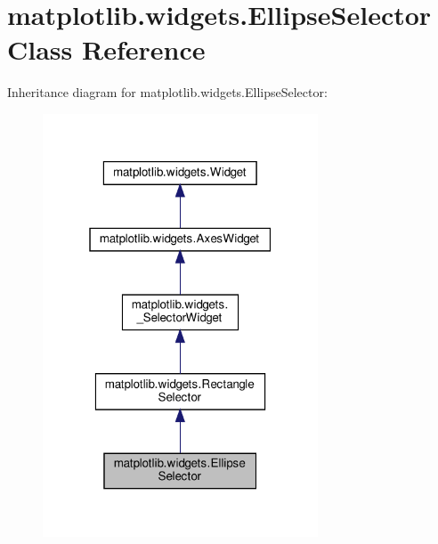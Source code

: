 \hypertarget{classmatplotlib_1_1widgets_1_1EllipseSelector}{}\section{matplotlib.\+widgets.\+Ellipse\+Selector Class Reference}
\label{classmatplotlib_1_1widgets_1_1EllipseSelector}


Inheritance diagram for matplotlib.\+widgets.\+Ellipse\+Selector\+:
\nopagebreak
\begin{figure}[H]
\begin{center}
\leavevmode
\includegraphics[width=232pt]{classmatplotlib_1_1widgets_1_1EllipseSelector__inherit__graph}
\end{center}
\end{figure}


